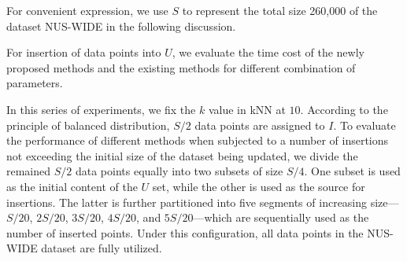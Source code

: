For convenient expression, we use $S$ to represent the total size 260,000 of the dataset 
NUS-WIDE in the following discussion.

For insertion of data points into $U$, we evaluate the time cost of the newly proposed methods and the existing methods for different combination of parameters.


In this series of experiments, we fix the $k$ value in kNN at $10$. According to the principle of balanced distribution, $S/2$ data points are assigned to $I$. To evaluate the performance of different methods when subjected to a number of insertions not exceeding the initial size of the dataset being updated, we divide the remained $S/2$ data points equally into two subsets of size $S/4$. One subset is used as the initial content of the $U$ set, while the other is used as the source for insertions. The latter is further partitioned into five segments of increasing size—$S/20$, $2S/20$, $3S/20$, $4S/20$, and $5S/20$—which are sequentially used as the number of inserted points. Under this configuration, all data points in the NUS-WIDE dataset are fully utilized.

